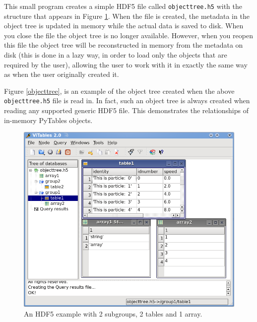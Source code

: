 This small program creates a simple HDF5 file called
\texttt{objecttree.h5} with the structure that appears in
Figure \ref{objecttree-h5}.
When the file is created, the metadata in the object tree is updated
in memory while the actual data is saved to disk. When you close the
file the object tree is no longer available. However, when you reopen
this file the object tree will be reconstructed in memory from the
metadata on disk (this is done in a lazy way, in order to load only
the objects that are required by the user), allowing the user to work with
it in exactly the same way as when the user originally created it.

Figure \ref{objecttree}, is an example of the object tree created when the above
\texttt{objecttree.h5} file is read in.  In fact, such an object
tree is always created when reading any supported generic HDF5 file.
This demonstrates the relationships of in-memory PyTables objects.

\begin{figure}
\begin{center}
\includegraphics[scale=0.75]{figures/objecttree-h5.png}
\caption{An HDF5 example with 2 subgroups, 2 tables and 1 array.}
\label{objecttree-h5}
\end{center}
\end{figure}

